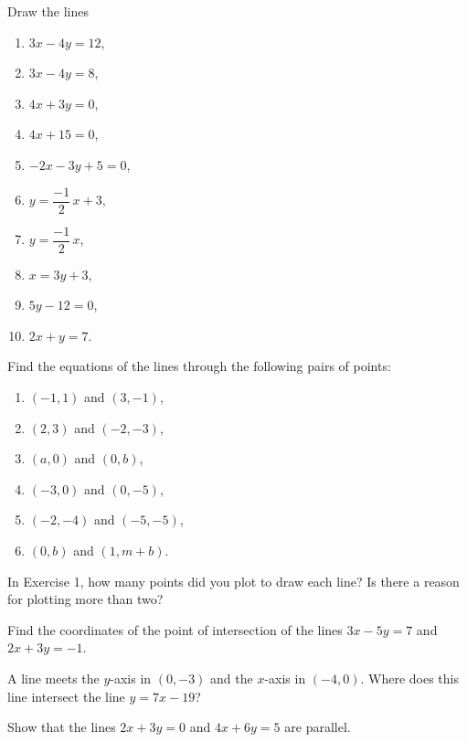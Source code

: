 \documentclass[11pt]{book}
\theoremstyle{bkplain}
\begin{document}
\begin{exercisecols}
\begin{exlist}
\item Draw the lines
  \begin{enumerate}[label=(\alph*),leftmargin=1.5em,itemsep=0pt,topsep=2pt,
    parsep=0pt]
  \item $3x - 4y = 12$,
  \item $3x - 4y = 8$,
  \item $4x + 3y = 0$,
  \item $4x + 15 = 0$,
  \item $-2x - 3y + 5 = 0$,
  \item $y = \dfrac{-1}{2}\,x + 3$,
  \item $y = \dfrac{-1}{2}\,x$,
  \item $x = 3y + 3$,
  \item[(k)] $5y - 12 = 0$,
  \item[(l)] $2x + y = 7$.
  \end{enumerate}
\item Find the equations of the lines through the following pairs of points:
  \begin{enumerate}[label=(\alph*),leftmargin=1.5em,itemsep=0pt,topsep=2pt,
    parsep=0pt]
  \item $(-1, 1)$ and $(3, -1)$,
  \item $(2, 3)$ and $(-2, -3)$,
  \item $(a, 0)$ and $(0, b)$,
  \item $(-3, 0)$ and $(0, -5)$,
  \item $(-2, -4)$ and $(-5, -5)$,
  \item $(0, b)$ and $(1, m + b)$.
  \end{enumerate}
\item In Exercise 1, how many points did you plot to draw each line? Is there
  a reason for plotting more than two?
\item Find the coordinates of the point of intersection of the lines
  $3x - 5y = 7$ and $2x + 3y = -1$.
\item A line meets the $y$-axis in $(0, -3)$ and the $x$-axis in $(-4, 0)$.
  Where does this line intersect the line $y = 7x - 19$?
\item Show that the lines $2x + 3y = 0$ and $4x + 6y = 5$ are parallel.
\end{exlist}
\end{exercisecols}

\end{document}
